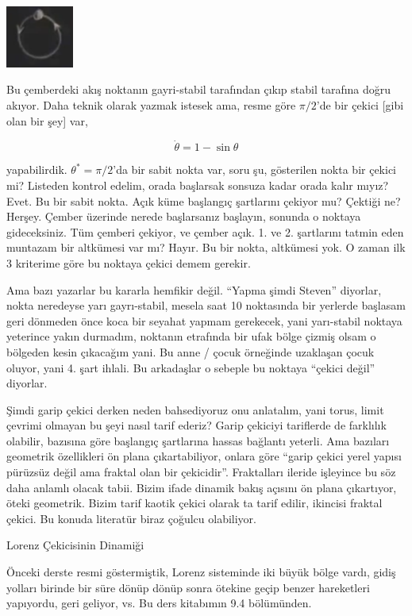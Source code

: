 \documentclass[12pt,fleqn]{article}\usepackage{../../common}
\begin{document}
\includegraphics[width=6em]{18_03.png}

Bu çemberdeki akış noktanın gayri-stabil tarafından çıkıp stabil tarafına
doğru akıyor. Daha teknik olarak yazmak istesek ama, resme göre $\pi/2$'de
bir çekici [gibi olan bir şey] var, 

$$ \dot{\theta} = 1 - \sin\theta $$

yapabilirdik. $\theta^* = \pi/2$'da bir sabit nokta var, soru şu,
gösterilen nokta bir çekici mi? Listeden kontrol edelim, orada başlarsak
sonsuza kadar orada kalır mıyız? Evet. Bu bir sabit nokta. Açık küme
başlangıç şartlarını çekiyor mu? Çektiği ne? Herşey. Çember üzerinde nerede
başlarsanız başlayın, sonunda o noktaya gideceksiniz. Tüm çemberi çekiyor,
ve çember açık. 1. ve 2. şartlarını tatmin eden muntazam bir altkümesi var
mı? Hayır. Bu bir nokta, altkümesi yok. O zaman ilk 3 kriterime göre bu
noktaya çekici demem gerekir.

Ama bazı yazarlar bu kararla hemfikir değil. ``Yapma şimdi Steven''
diyorlar, nokta neredeyse yarı gayrı-stabil, mesela saat 10 noktasında bir
yerlerde başlasam geri dönmeden önce koca bir seyahat yapmam gerekecek,
yani yarı-stabil noktaya yeterince yakın durmadım, noktanın etrafında bir
ufak bölge çizmiş olsam o bölgeden kesin çıkacağım yani. Bu anne / çocuk
örneğinde uzaklaşan çocuk oluyor, yani 4. şart ihlali. Bu arkadaşlar o
sebeple bu noktaya ``çekici değil'' diyorlar. 

Şimdi garip çekici derken neden bahsediyoruz onu anlatalım, yani torus,
limit çevrimi olmayan bu şeyi nasıl tarif ederiz? Garip çekiciyi tariflerde
de farklılık olabilir, bazısına göre başlangıç şartlarına hassas bağlantı
yeterli. Ama bazıları geometrik özellikleri ön plana çıkartabiliyor, onlara
göre ``garip çekici yerel yapısı pürüzsüz değil ama fraktal olan bir
çekicidir''.  Fraktalları ileride işleyince bu söz daha anlamlı olacak
tabii. Bizim ifade dinamik bakış açısını ön plana çıkartıyor, öteki
geometrik. Bizim tarif kaotik çekici olarak ta tarif edilir, ikincisi
fraktal çekici. Bu konuda literatür biraz çoğulcu olabiliyor. 

Lorenz Çekicisinin Dinamiği

Önceki derste resmi göstermiştik, Lorenz sisteminde iki büyük bölge
vardı, gidiş yolları birinde bir süre dönüp dönüp sonra ötekine geçip
benzer hareketleri yapıyordu, geri geliyor, vs. Bu ders kitabımın 9.4
bölümünden. 
\end{document}
